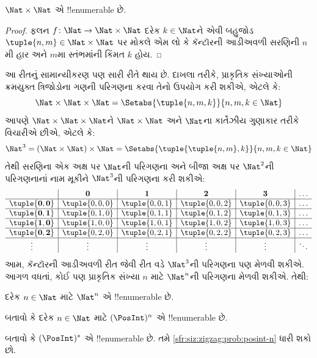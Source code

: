 \documentclass[../../../include/open-logic-section]{subfiles}
\begin{document}
\begin{prop}
$\Nat \times \Nat$ એ !!{enumerable} છે.
\end{prop}

\begin{proof}
ફલન $f \colon \Nat \to \Nat\times\Nat$ દરેક
$k \in \Nat$ને એવી બહુજોડ
$\tuple{n,m} \in \Nat \times \Nat$ પર મોકલે એમ લો
કે કૅન્ટૉરની આડીઅવળી સરણિની $n$મી હાર અને
$m$મા સ્તંભમાંની કિંમત $k$ હોય.
\end{proof}

\begin{explain}
આ રીતનું સામાન્યીકરણ પણ સારી રીતે થાય છે. દાખલા તરીકે,
પ્રાકૃતિક સંખ્યાઓની ક્રમયુક્ત ત્રિજોડોના ગણની પરિગણના
કરવા તેનો ઉપયોગ કરી શકીએ, એટલે કે:
\[
\Nat \times \Nat \times \Nat = \Setabs{\tuple{n,m,k}}{n,m,k \in \Nat}
\]
આપણે $\Nat \times \Nat \times \Nat$ને
$\Nat \times \Nat$ અને $\Nat$ના કાર્તેઝીય ગુણાકાર
તરીકે વિચારીએ છીએ, એટલે કે:
\[
\Nat^3 = (\Nat \times \Nat) \times \Nat =
\Setabs{\tuple{\tuple{n,m},k}}{n, m, k
  \in \Nat }
\]
તેથી સરણિના એક અક્ષ પર $\Nat$ની પરિગણના
અને બીજા અક્ષ પર $\Nat^2$ની પરિગણનાનાં નામ
મૂકીને $\Nat^3$ની પરિગણના કરી શકીએ:
\[
\begin{array}{ c | c | c | c | c | c}
& \mathbf 0 & \mathbf 1 & \mathbf 2 & \mathbf 3 & \dots \\
\hline
\mathbf{\tuple{0,0}} & \tuple{0,0,0} & \tuple{0,0,1} & \tuple{0,0,2} & \tuple{0,0,3} & \dots \\
\hline
\mathbf{\tuple{0,1}} & \tuple{0,1,0} & \tuple{0,1,1} & \tuple{0,1,2} & \tuple{0,1,3} & \dots \\
\hline
\mathbf{\tuple{1,0}} & \tuple{1,0,0} & \tuple{1,0,1} & \tuple{1,0,2} & \tuple{1,0,3} & \dots \\
\hline
\mathbf{\tuple{0,2}} & \tuple{0,2,0} & \tuple{0,2,1} & \tuple{0,2,2} & \tuple{0,2,3} & \dots\\
\hline
\vdots & \vdots & \vdots & \vdots & \vdots & \ddots \\
\end{array}
\]
આમ, કૅન્ટૉરની આડીઅવળી રીત જેવી રીત વડે
$\Nat^3$ની પરિગણના પણ મેળવી શકીએ.
આગળ વધતાં, કોઈ પણ પ્રાકૃતિક સંખ્યા $n$ માટે
$\Nat^n$ની પરિગણના મેળવી શકીએ. તેથી:
\end{explain}

\begin{prop}
દરેક $n \in \Nat$ માટે $\Nat^n$ એ !!{enumerable} છે.
\end{prop}

\begin{prob}\label{sfr:siz:zigzag:prob:posint-n}
બતાવો કે દરેક $n \in \Nat$ માટે $(\PosInt)^n$
એ !!{enumerable} છે.
\end{prob}

\begin{prob}\label{sfr:siz:zigzag:prob:posint-star}
બતાવો કે $(\PosInt)^*$ એ !!{enumerable} છે.
તમે \cref{sfr:siz:zigzag:prob:posint-n} ધારી શકો છો.
\end{prob}
\end{document}
